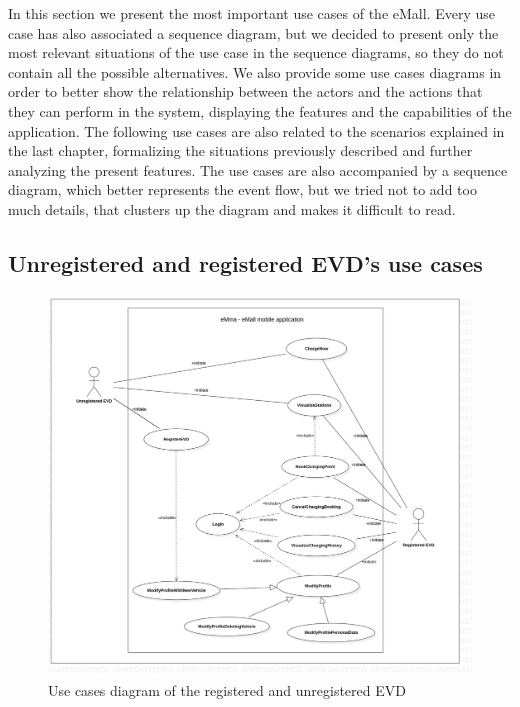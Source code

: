In this section we present the most important use cases of the eMall. Every use case has also associated a sequence diagram, but we decided to present only the most relevant situations of the use case in the sequence diagrams, so they do not contain all the possible alternatives. We also provide some use cases diagrams in order to better show the relationship between the actors and the actions that they can perform in the system, displaying the features and the capabilities of the application.
The following use cases are also related to the scenarios explained in the last chapter, formalizing the situations previously described and further analyzing the present features.
The use cases are also accompanied by a sequence diagram, which better represents the event flow, but we tried not to add too much details, that clusters up the diagram and makes it difficult to read.

\subsection{Unregistered and registered EVD's use cases}
\begin{figure}[H]
    \centering
    \includegraphics[width=1\textwidth, trim = {3cm 2cm 3cm 1cm}, clip]{Images/cp3/UseCaseDiagramEVD.png}
    \caption{Use cases diagram of the registered and unregistered EVD}
\end{figure}

